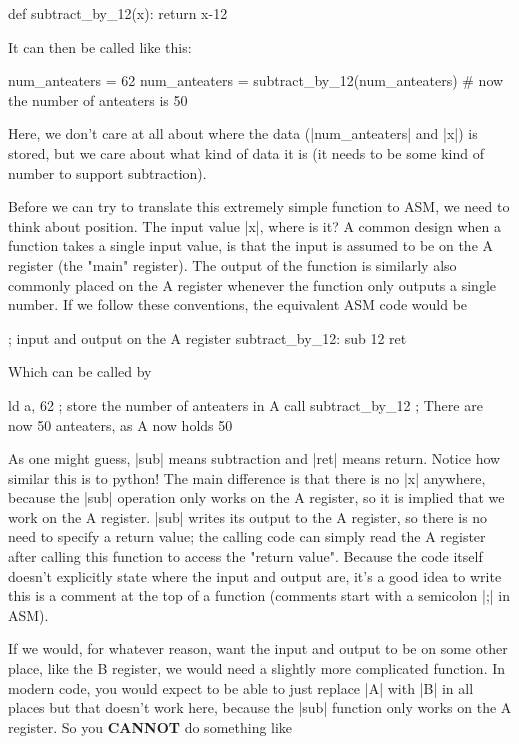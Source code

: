 \documentclass[11pt]{book}
\begin{document}
\begin{code}
def subtract_by_12(x):
    return x-12
\end{code}

It can then be called like this:

\begin{code}
num_anteaters = 62
num_anteaters = subtract_by_12(num_anteaters)
# now the number of anteaters is 50
\end{code}

Here, we don't care at all about where the data (|num_anteaters| and |x|) is stored, but we care about what kind of data it is (it needs to be some kind of number to support subtraction). 

Before we can try to translate this extremely simple function to ASM, we need to think about position. The input value |x|, where is it? A common design when a function takes a single input value, is that the input is assumed to be on the A register (the "main" register). The output of the function is similarly also commonly placed on the A register whenever the function only outputs a single number. If we follow these conventions, the equivalent ASM code would be 

\begin{code}
; input and output on the A register
subtract_by_12:
    sub 12
    ret
\end{code}

Which can be called by

\begin{code}
ld a, 62 ; store the number of anteaters in A 
call subtract_by_12
; There are now 50 anteaters, as A now holds 50
\end{code}

As one might guess, |sub| means subtraction and |ret| means return. Notice how similar this is to python! The main difference is that there is no |x| anywhere, because the |sub| operation only works on the A register, so it is implied that we work on the A register. |sub| writes its output to the A register, so there is no need to specify a return value; the calling code can simply read the A register after calling this function to access the "return value". Because the code itself doesn't explicitly state where the input and output are, it's a good idea to write this is a comment at the top of a function (comments start with a semicolon |;| in ASM).

If we would, for whatever reason, want the input and output to be on some other place, like the B register, we would need a slightly more complicated function. In modern code, you would expect to be able to just replace |A| with |B| in all places but that doesn't work here, because the |sub| function only works on the A register. So you \textbf{CANNOT} do something like 
\end{document}
